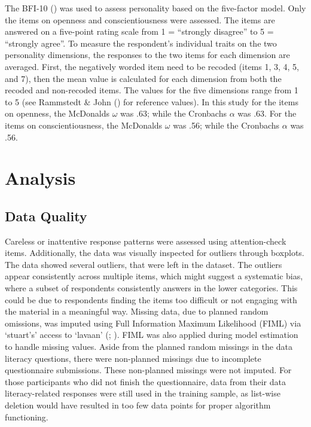 \documentclass[
  12pt,
  a4paper,
  twoside]{article}
\begin{document}
The BFI-10 () was used to assess personality based on the five-factor model.
Only the items on openness and conscientiousness were assessed.
The items are answered on a five-point rating scale from 1 = ``strongly disagree'' to 5 = ``strongly agree''.
To measure the respondent's individual traits on the two personality dimensions, the responses to the two items for each dimension are averaged.
First, the negatively worded item need to be recoded (items 1, 3, 4, 5, and 7), then the mean value is calculated for each dimension from both the recoded and non-recoded items.
The values for the five dimensions range from 1 to 5 (see Rammstedt \& John () for reference values).
In this study for the items on openness, the McDonalds \(\omega\) was .63; while the Cronbachs \(\alpha\) was .63.
For the items on conscientiousness, the McDonalds \(\omega\) was .56; while the Cronbachs \(\alpha\) was .56.

\section{Analysis}\label{analysis}

\subsection{Data Quality}\label{data-quality}

Careless or inattentive response patterns were assessed using attention-check items. Additionally, the data was visually inspected for outliers through boxplots. The data showed several outliers, that were left in the dataset. The outliers appear consistently across multiple items, which might suggest a systematic bias, where a subset of respondents consistently answers in the lower categories. This could be due to respondents finding the items too difficult or not engaging with the material in a meaningful way. Missing data, due to planned random omissions, was imputed using Full Information Maximum Likelihood (FIML) via `stuart's' access to `lavaan' (; ). FIML was also applied during model estimation to handle missing values. Aside from the planned random missings in the data literacy questions, there were non-planned missings due to incomplete questionnaire submissions. These non-planned missings were not imputed. For those participants who did not finish the questionnaire, data from their data literacy-related responses were still used in the training sample, as list-wise deletion would have resulted in too few data points for proper algorithm functioning.
\end{document}
